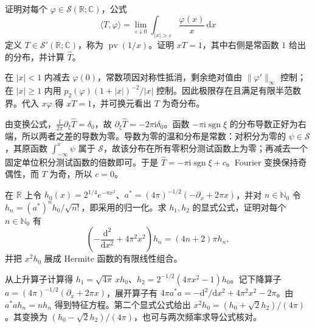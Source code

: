 \begin{optionalexercise}\label{b2:ex:05-principal-value}
证明对每个 \(\varphi\in\mathcal S(\mathbb R;\mathbb C)\)，公式
\[
 \langle T,\varphi\rangle
 =\lim_{\varepsilon\downarrow0}\int_{|x|>\varepsilon}\dfrac{\varphi(x)}x\,\mathrm{d}x
\]
定义 \(T\in\mathcal S'(\mathbb R;\mathbb C)\)，称为 \(\operatorname{pv}(1/x)\)。证明 \(xT=1\)，其中右侧是常函数 \(1\) 给出的分布，并计算 \(\widehat T\)。
\end{optionalexercise}
\begin{solution}
在 \(|x|<1\) 内减去 \(\varphi(0)\)，常数项因对称性抵消，剩余绝对值由 \(\|\varphi'\|_\infty\) 控制；在 \(|x|\geq1\) 内用 \(p_2(\varphi)(1+|x|)^{-2}/|x|\) 控制。因此极限存在且满足有限半范数界。代入 \(x\varphi\) 得 \(xT=1\)，并可换元看出 \(T\) 为奇分布。

由变换公式，\(\frac{\mathrm{i}}{2\pi}\partial_\xi\widehat T=\delta_0\)，故 \(\partial_\xi\widehat T=-2\pi\mathrm{i}\delta_0\)。函数 \(-\pi\mathrm{i}\operatorname{sgn}\xi\) 的分布导数正好为右端，所以两者之差的导数为零。导数为零的温和分布是常数：对积分为零的 \(\psi\in\mathcal S\)，其原函数 \(\int_{-\infty}^x\psi\) 属于 \(\mathcal S\)，故该分布在所有零积分测试函数上为零；再减去一个固定单位积分测试函数的倍数即可。于是 \(\widehat T=-\pi\mathrm{i}\operatorname{sgn}\xi+c\)。Fourier 变换保持奇偶性，而 \(T\) 为奇，所以 \(c=0\)。
\end{solution}

\begin{optionalexercise}\label{b2:ex:05-hermite-oscillator}
在 \(\mathbb R\) 上令 \(h_0(x)=2^{1/4}e^{-\pi x^2}\)、\(a^*=(4\pi)^{-1/2}(-\partial_x+2\pi x)\)，并对 \(n\in\mathbb N_0\) 令 \(h_n=(a^*)^nh_0/\sqrt{n!}\)，即采用的归一化。求 \(h_1,h_2\) 的显式公式，证明对每个 \(n\in\mathbb N_0\) 有
\[
 \left(-\dfrac{\mathrm{d}^2}{\mathrm{d}x^2}+4\pi^2x^2\right)h_n
 =(4n+2)\pi h_n,
\]
并把 \(x^2h_0\) 展成 Hermite 函数的有限线性组合。
\end{optionalexercise}
\begin{solution}
从上升算子计算得 \(h_1=\sqrt{4\pi}\,xh_0\)、\(h_2=2^{-1/2}(4\pi x^2-1)h_0\)。记下降算子 \(a=(4\pi)^{-1/2}(\partial_x+2\pi x)\)，展开算子有 \(4\pi a^*a=-\mathrm{d}^2/\mathrm{d}x^2+4\pi^2x^2-2\pi\)。由 \(a^*ah_n=nh_n\) 得到特征方程。第二个显式公式给出 \(x^2h_0=(h_0+\sqrt2h_2)/(4\pi)\)。其变换为 \((h_0-\sqrt2h_2)/(4\pi)\)，也可与两次频率求导公式核对。
\end{solution}

